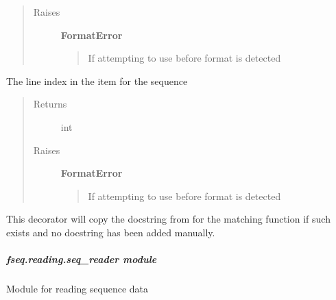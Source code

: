 \documentclass[letterpaper,10pt,english]{sphinxmanual}
\begin{document}
\begin{fulllineitems}
\begin{fulllineitems}
\begin{quote}
\begin{description}
\item[{Raises}] \leavevmode
\textbf{FormatError}
\begin{quote}

If attempting to use before format is detected
\end{quote}

\end{description}\end{quote}

\end{fulllineitems}


\begin{fulllineitems}
\label{fseq.reading:fseq.reading.seq_encoder.SeqFormatDetector.sequenceLine}
The line index in the item for the sequence
\begin{quote}\begin{description}
\item[{Returns}] \leavevmode
int

\item[{Raises}] \leavevmode
\textbf{FormatError}
\begin{quote}

If attempting to use before format is detected
\end{quote}

\end{description}\end{quote}

\end{fulllineitems}


\end{fulllineitems}


\begin{fulllineitems}
\label{fseq.reading:fseq.reading.seq_encoder.inheritDocFromSeqFormat}
This decorator will copy the docstring from  for the
matching function  if such exists and no docstring has been added
manually.

\end{fulllineitems}



\subparagraph{fseq.reading.seq\_reader module}
\label{fseq.reading:module-fseq.reading.seq_reader}\label{fseq.reading:fseq-reading-seq-reader-module}
Module for reading sequence data
\end{document}

